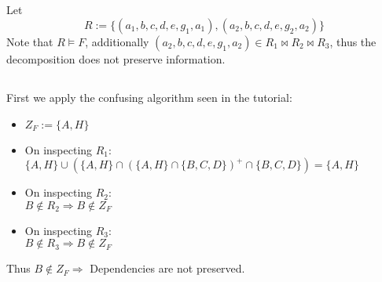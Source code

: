 \subsection{}
Let
$$
R := \{(a_1, b, c, d, e, g_1, a_1), (a_2, b, c, d, e, g_2, a_2)\}
$$
Note that $R\models F$,
additionally $(a_2, b, c, d, e, g_1, a_2)\in R_1\bowtie R_2\bowtie R_3$,
thus the decomposition does not preserve information.


\subsection{}
First we apply the confusing algorithm seen in the tutorial:

\begin{itemize}
	\item $Z_F := \{A,H\}$
	\item On inspecting $R_1$:\\ $\{A,H\}\cup (\{A,H\}\cap (\{A,H\}\cap \{B,C,D\})^+\cap \{B,C,D\})=\{A,H\}$
	\item On inspecting $R_2$:\\ $B\notin R_2 \Rightarrow  B\notin Z_F$
	\item On inspecting $R_3$:\\ $B\notin R_3 \Rightarrow  B\notin Z_F$
\end{itemize}
Thus $B\notin Z_F\Rightarrow $ Dependencies are not preserved.